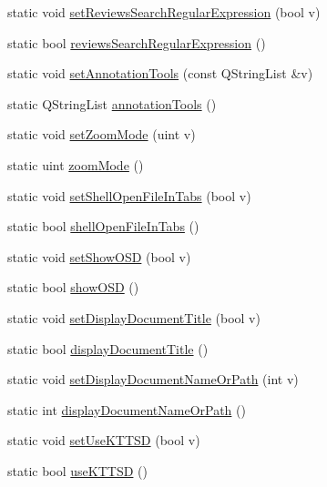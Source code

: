 \begin{DoxyCompactItemize}
\item 
static void \hyperlink{classOkular_1_1Settings_a2f5c134a93e837e3f9d82913774ceb56}{set\+Reviews\+Search\+Regular\+Expression} (bool v)
\item 
static bool \hyperlink{classOkular_1_1Settings_a820f7ec097ed7b26acd19caa00f730fb}{reviews\+Search\+Regular\+Expression} ()
\item 
static void \hyperlink{classOkular_1_1Settings_ac1febada92ab425b5e66c16d3d291ea5}{set\+Annotation\+Tools} (const Q\+String\+List \&v)
\item 
static Q\+String\+List \hyperlink{classOkular_1_1Settings_a514e900aa0ed6dcc26aa1daa2521eaa5}{annotation\+Tools} ()
\item 
static void \hyperlink{classOkular_1_1Settings_a6721d0780ac494da0ab7ee21a1b741b6}{set\+Zoom\+Mode} (uint v)
\item 
static uint \hyperlink{classOkular_1_1Settings_afe2a387ad175a0ad4208cfe947a7e7a0}{zoom\+Mode} ()
\item 
static void \hyperlink{classOkular_1_1Settings_a28e0ef9db370b39dfab815d2b9c555af}{set\+Shell\+Open\+File\+In\+Tabs} (bool v)
\item 
static bool \hyperlink{classOkular_1_1Settings_ad1876d9ee3064ac76578d95dd1d22729}{shell\+Open\+File\+In\+Tabs} ()
\item 
static void \hyperlink{classOkular_1_1Settings_a9ff75be61dbc22b4af11b845dd2bc727}{set\+Show\+O\+S\+D} (bool v)
\item 
static bool \hyperlink{classOkular_1_1Settings_ab6a3d4459b9ef5fa47cc7083968da797}{show\+O\+S\+D} ()
\item 
static void \hyperlink{classOkular_1_1Settings_a9dbad3f635229b9acdb7bc06dd87434d}{set\+Display\+Document\+Title} (bool v)
\item 
static bool \hyperlink{classOkular_1_1Settings_a5e18f7b4c21285383a7c26952b0081ba}{display\+Document\+Title} ()
\item 
static void \hyperlink{classOkular_1_1Settings_a506524a5647de9820e4d529c241fa718}{set\+Display\+Document\+Name\+Or\+Path} (int v)
\item 
static int \hyperlink{classOkular_1_1Settings_a4892e90b447768331efb974a858df49d}{display\+Document\+Name\+Or\+Path} ()
\item 
static void \hyperlink{classOkular_1_1Settings_a262aea332741613d596985c6775068f9}{set\+Use\+K\+T\+T\+S\+D} (bool v)
\item 
static bool \hyperlink{classOkular_1_1Settings_a165dd0c56407e353bda8a773fa1ad485}{use\+K\+T\+T\+S\+D} ()

\end{DoxyCompactItemize}
